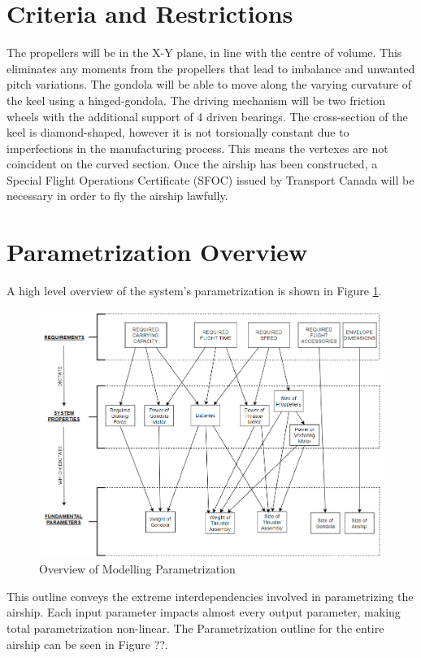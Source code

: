 \documentclass[../main.tex]{subfiles}
\begin{document}
\section{Criteria and Restrictions}
The propellers will be in the X-Y plane, in line with the centre of volume. This eliminates any moments from the propellers that lead to imbalance and unwanted pitch variations. The gondola will be able to move along the varying curvature of the keel using a hinged-gondola. The driving mechanism will be two friction wheels with the additional support of 4 driven bearings. The cross-section of the keel is diamond-shaped, however it is not torsionally constant due to imperfections in the manufacturing process. This means the vertexes are not coincident on the curved section. Once the airship has been constructed, a Special Flight Operations Certificate (SFOC) issued by Transport Canada will be necessary in order to fly the airship lawfully.

\section{Parametrization Overview}
A high level overview of the system's parametrization is shown in Figure \ref{fig:ModellingOutline}.

\begin{figure}[H]
	\centering
	\includegraphics[width=\textwidth]{img/paramaterization/Brief_Overview.png}
	\caption{Overview of Modelling Parametrization}
	\label{fig:ModellingOutline}
\end{figure}

This outline conveys the extreme interdependencies involved in parametrizing the airship. Each input parameter impacts almost every output parameter, making total parametrization non-linear. The Parametrization outline for the entire airship can be seen in Figure ??.
\end{document}
